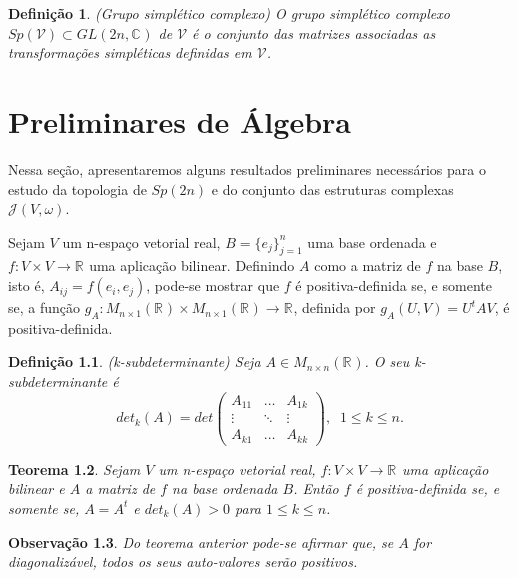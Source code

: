 \documentclass[12pt]{book}
\newtheorem{teorema}{Teorema}[section]
\newtheorem{definicao}[teorema]{Definição}
\newtheorem{observacao}[teorema]{Observação}
\newcommand{\complexificado}[1]{\mathcal{#1}}
\newcommand{\complexo}[1]{\mathbb{C}^{#1}}
\newcommand{\estruturascomplexas}[2]{\mathcal{J}(#1, #2)}
\newcommand{\generalgroup}[2]{GL(#1, #2)}
\newcommand{\generalgroupcomplexo}[1]{\generalgroup{#1}{\complexo{}}}
\newcommand{\gruposimpletico}[1]{Sp(#1)}
\newcommand{\matrizquadreal}[1]{M_{#1 \times #1}(\real{})}
\newcommand{\real}[1]{\mathbb{R}^{#1}}
\newcommand{\reta}{\real{}}
\begin{document}
	\begin{definicao}
		(Grupo simplético complexo) O grupo simplético complexo $\gruposimpletico{\complexificado{V}} \subset \generalgroupcomplexo{2n}$ de $\complexificado{V}$ é o conjunto das matrizes associadas as transformações simpléticas definidas em $\complexificado{V}$.
	\end{definicao}
	
	\chapter{Preliminares de Álgebra}
	
	Nessa seção, apresentaremos alguns resultados preliminares necessários para o estudo da topologia de $\gruposimpletico{2n}$ e do conjunto das estruturas complexas $\estruturascomplexas{V}{\omega}$.
	
	
	Sejam $V$ um n-espaço vetorial real, $B= \{e_{j}\}_{j=1}^{n}$ uma base ordenada e $f:V\times V\to \reta$ uma aplicação bilinear. Definindo $A$ como a matriz de $f$ na base $B$, isto é, $A_{ij} = f(e_{i}, e_{j})$, pode-se mostrar que $f$ é positiva-definida se, e somente se, a função $g_{A}: M_{n\times 1}(\reta)\times M_{n\times 1}(\reta) \to \reta$, definida por $
	g_{A}(U,V) = U^{t}AV$, é positiva-definida.
	
	\begin{definicao}
		(k-subdeterminante) Seja $A \in \matrizquadreal{n}$. O seu k-subdeterminante é
		$$
		det_{k}(A) =
		det \left(
		\begin{array}{ccc}
		A_{11} & \dots & A_{1k}
		\\
		\vdots & \ddots & \vdots
		\\
		A_{k1} & \dots & A_{kk}
		\end{array}
		\right),\;\; 1\leq k \leq n.
		$$
	\end{definicao}
	
	\begin{teorema}\label{teorema_matriz_positiva_definida}
		Sejam $V$ um n-espaço vetorial real, $f: V\times V\to \reta$ uma aplicação bilinear e $A$ a matriz de $f$ na base ordenada $B$. Então $f$ é positiva-definida se, e somente se, $A=A^{t}$ e $det_{k}(A)>0$ para $1\leq k\leq n$.
	\end{teorema}
	
	\begin{observacao}\label{observacao_matriz_positiva_definida}
		Do teorema anterior pode-se afirmar que, se $A$ for diagonalizável, todos os seus auto-valores serão positivos.
	\end{observacao}
	
\end{document}

